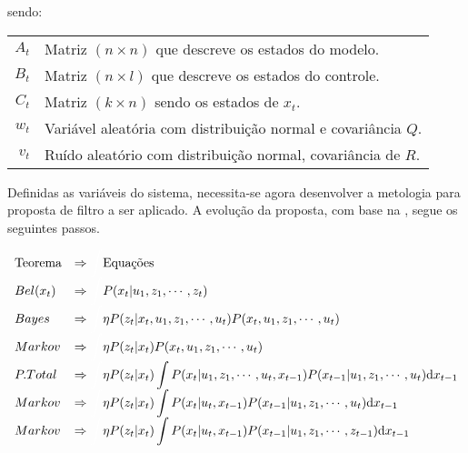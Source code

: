 \noindent sendo:

\begin{center}
    \begin{tabular}{ r | l }
        ${A}_t$ & Matriz $(n \times n)$ que descreve os estados do modelo.      \\
        ${B}_t$ & Matriz $(n \times l)$ que descreve os estados do controle.    \\
        ${C}_t$ & Matriz $(k\times n)$ sendo os estados de $x_t$.               \\
        $w_t$   & Variável aleatória com distribuição normal e covariância ${Q}$. \\
        $v_t$   & Ruído aleatório com distribuição normal, covariância de ${R}$.
    \end{tabular}
\end{center}

Definidas as variáveis do sistema, necessita-se agora desenvolver a metologia para proposta de filtro a ser aplicado. A evolução da proposta, com base na , segue os seguintes passos.

\begin{equation*}
    \begin{array}{ll}
        \text{Teorema} & \Rightarrow\textcolor{white}{\displaystyle\int}\text{Equações} \\
        Bel(x_t) & \Rightarrow\textcolor{white}{\displaystyle\int} P(x_t| u_1, z_1,  \cdots, z_t) \\
        Bayes & \Rightarrow\textcolor{white}{\displaystyle\int} \eta P(z_t|x_t,  u_1, z_1,  \cdots,  u_t)P(x_t, u_1, z_1, \cdots, u_t) \\
        Markov & \Rightarrow\textcolor{white}{\displaystyle\int} \eta P(z_t|x_t)P(x_t, u_1, z_1, \cdots, u_t) \\
        P. Total & \Rightarrow\textcolor{white}{\displaystyle\int} \eta P(z_t|x_t)\displaystyle\int P(x_t| u_1, z_1, \cdots, u_t,x_{t-1})P(x_{t-1}| u_1, z_1, \cdots, u_t)\text{d}x_{t-1}\\
        Markov & \Rightarrow\textcolor{white}{\displaystyle\int} \eta P(z_t|x_t) \displaystyle\int P(x_t| u_t,x_{t-1})P(x_{t-1}| u_1, z_1, \cdots, u_t)\text{d}x_{t-1} \\
        Markov & \Rightarrow\textcolor{white}{\displaystyle\int} \eta P(z_t|x_t) \displaystyle\int P(x_t| u_t,x_{t-1}){P(x_{t-1}| u_1, z_1, \cdots, z_{t-1}}){\text{d}x_{t-1}} \\
    \end{array}   
\end{equation*}

